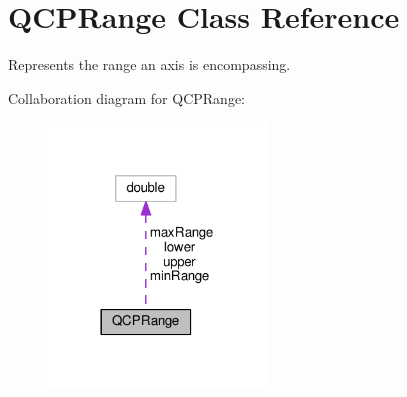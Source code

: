 \hypertarget{classQCPRange}{}\section{Q\+C\+P\+Range Class Reference}
\label{classQCPRange}


Represents the range an axis is encompassing.  




Collaboration diagram for Q\+C\+P\+Range\+:
\nopagebreak
\begin{figure}[H]
\begin{center}
\leavevmode
\includegraphics[width=165pt]{classQCPRange__coll__graph}
\end{center}
\end{figure}
